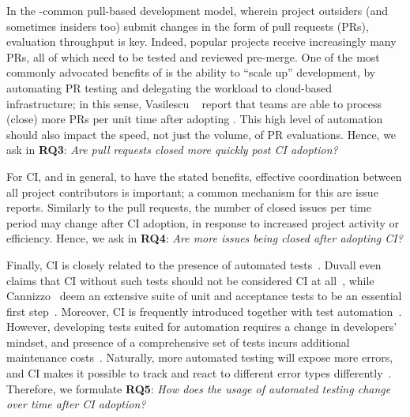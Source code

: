 In the \GH-common pull-based development model, wherein project outsiders 
(and sometimes insiders too) submit changes in the form of pull requests (PRs), 
evaluation throughput is key.
Indeed, popular \GH projects receive increasingly many PRs, all of which need 
to be tested and reviewed pre-merge.
One of the most commonly advocated benefits of \Tvis is the ability to ``scale up'' 
development, by automating PR testing and delegating the workload to cloud-based
infrastructure; in this sense, Vasilescu \etal~\cite{VasilescuYWDF15} report that 
\GH teams are able to process (\ie close) more PRs per unit time after adopting \Tvis.
This high level of automation should also impact the speed, not just the volume, of
PR evaluations.
Hence, we ask in \textbf{RQ3}: 
\emph{Are pull requests closed more quickly post CI adoption?}

For CI, and \DO in general, to have the stated benefits, effective coordination
between all project contributors is important; a common mechanism for this
are issue reports.
Similarly to the pull requests, the number of closed issues per time period may change 
after CI adoption, in response to
increased project activity or efficiency. %
Hence, we ask in \textbf{RQ4}: 
\emph{Are more issues being closed after adopting CI?}

Finally, CI is closely related to the presence of automated tests~\cite{Fowler}. 
Duvall even claims that CI without such tests should not be considered CI 
at all~\cite{Duvall}, while Cannizzo \etal~deem an extensive 
suite of unit and acceptance tests to be an essential first step~\cite{CannizzoCluttonRamesh}. 
Moreover, CI is frequently introduced together with test automation~\cite{Yuksel}.
However, developing tests suited for automation requires a change in developers' 
mindset, and presence of a comprehensive set of tests incurs additional maintenance 
costs~\cite{CoramBohner}.
Naturally, more automated testing will expose more errors, and CI makes it possible 
to track and react to different error types differently~\cite{BellerGZ16}.
Therefore, we formulate \textbf{RQ5}: 
\emph{How does the usage of automated testing change over time after CI adoption?} 

